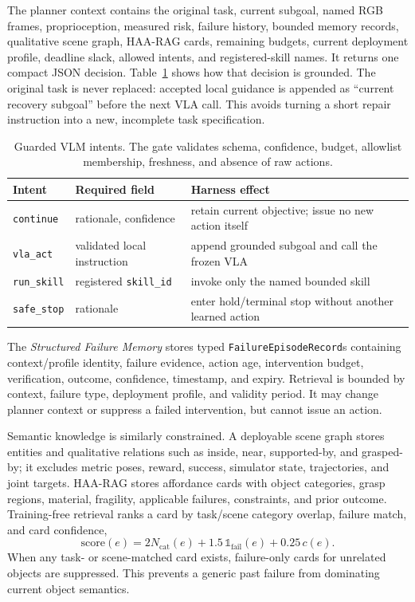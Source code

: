 \documentclass[runningheads]{waica}
\begin{document}
The planner context contains the original task, current subgoal, named RGB
frames, proprioception, measured risk, failure history, bounded memory records,
qualitative scene graph, HAA-RAG cards, remaining budgets, current deployment
profile, deadline slack, allowed intents, and registered-skill names. It returns
one compact JSON decision. Table~\ref{tab:intents} shows how that decision is
grounded. The original task is never replaced: accepted local guidance is
appended as ``current recovery subgoal'' before the next VLA call. This avoids
turning a short repair instruction into a new, incomplete task specification.

\begin{table}
\caption{Guarded VLM intents. The gate validates schema, confidence, budget,
allowlist membership, freshness, and absence of raw actions.}
\label{tab:intents}
\centering
\small
\begin{tabularx}{\textwidth}{p{}p{}X}
\toprule
Intent & Required field & Harness effect \\
\midrule
\texttt{continue} & rationale, confidence & retain current objective; issue no new action itself \\
\texttt{vla\_act} & validated local instruction & append grounded subgoal and call the frozen VLA \\
\texttt{run\_skill} & registered \texttt{skill\_id} & invoke only the named bounded skill \\
\texttt{safe\_stop} & rationale & enter hold/terminal stop without another learned action \\
\bottomrule
\end{tabularx}
\end{table}

The \emph{Structured Failure Memory} stores typed
\texttt{FailureEpisodeRecord}s containing context/profile identity, failure
evidence, action age, intervention budget, verification, outcome, confidence,
timestamp, and expiry. Retrieval is bounded by context, failure type,
deployment profile, and validity period. It may change planner context or
suppress a failed intervention, but cannot issue an action.

Semantic knowledge is similarly constrained. A deployable scene graph stores
entities and qualitative relations such as inside, near, supported-by, and
grasped-by; it excludes metric poses,
reward, success, simulator state, trajectories, and joint targets. HAA-RAG
stores affordance cards with object categories, grasp regions, material,
fragility, applicable failures, constraints, and prior outcome. Training-free
retrieval ranks a card by task/scene category overlap, failure match, and card
confidence,
\begin{equation}
\mathrm{score}(e)=2N_{\mathrm{cat}}(e)+1.5\,\mathbb{1}_{\mathrm{fail}}(e)
                   +0.25\,c(e).
\label{eq:haa}
\end{equation}
When any task- or scene-matched card exists, failure-only cards for unrelated
objects are suppressed. This prevents a generic past failure from dominating
current object semantics.
\end{document}

